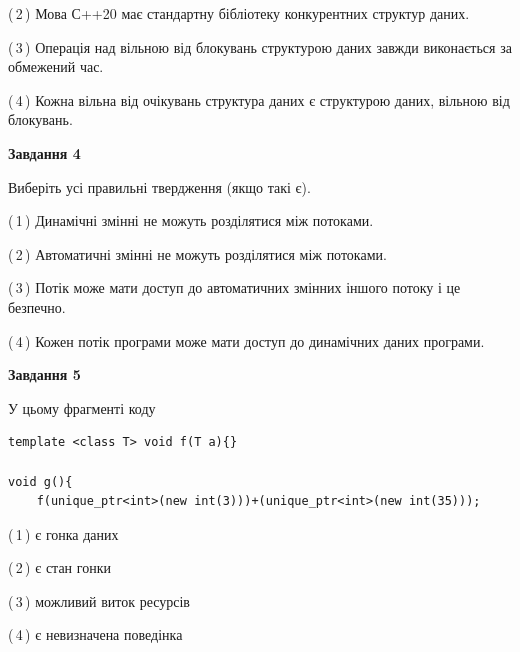 \documentclass[12pt, ukrainian]{article}
\begin{document}
\begin {large}
{(\,2\,) Мова С++20 має стандартну бібліотеку конкурентних структур даних.%

(\,3\,) Операція над вільною від блокувань структурою даних завжди виконається за обмежений час.%

(\,4\,) Кожна вільна від очікувань структура даних є структурою даних, вільною від блокувань.%



\begin{center}
\textbf{Завдання 4}
\end{center}
Виберіть усі правильні твердження (якщо такі є).\par
\vspace{2mm}

(\,1\,) Динамічні змінні не можуть розділятися між потоками.%

(\,2\,) Автоматичні змінні не можуть розділятися між потоками.%

(\,3\,) Потік може мати доступ до автоматичних змінних іншого потоку і це безпечно.%

(\,4\,) Кожен потік програми може мати доступ до динамічних даних програми.%



\begin{center}
\textbf{Завдання 5}
\end{center}
У цьому фрагменті коду
\begin{verbatim}
template <class T> void f(T a){}

void g(){
    f(unique_ptr<int>(new int(3)))+(unique_ptr<int>(new int(35)));
\end{verbatim}

(\,1\,) є гонка даних%

(\,2\,) є стан гонки%

(\,3\,) можливий виток ресурсів%

(\,4\,) є невизначена поведінка%


}
\end {large}
\end{document}
